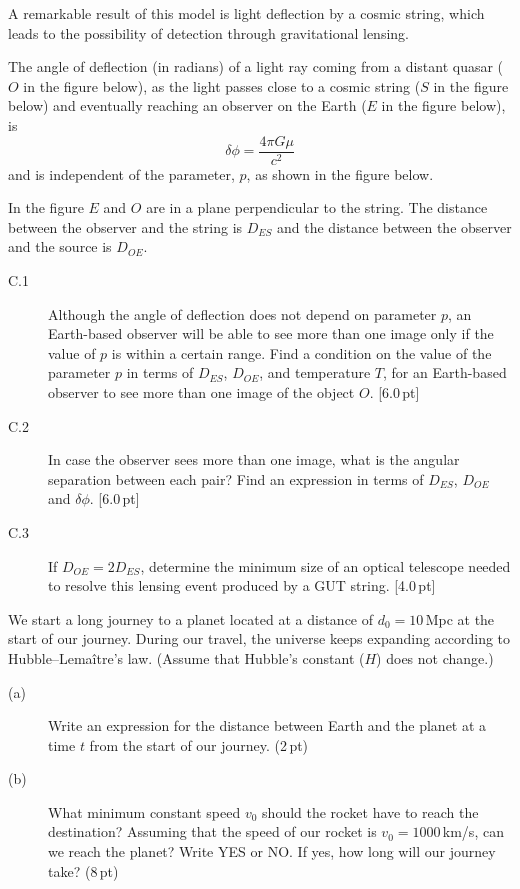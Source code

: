 A remarkable result of this model is light deflection by a cosmic string,
which leads to the possibility of detection through gravitational lensing.

The angle of deflection (in radians) of a light ray coming from a distant
quasar ($O$ in the figure below), as the light passes close to a cosmic string
($S$ in the figure below) and eventually reaching an observer on the Earth
($E$ in the figure below), is
\[ \delta\phi = \frac{4\pi G\mu}{c^2} \]
and is independent of the parameter, $p$, as shown in the figure below.

In the figure $E$ and $O$ are in a plane perpendicular to the string. The
distance between the observer and the string is $D_{ES}$ and the distance
between the observer and the source is $D_{OE}$.


\begin{description}
\item[C.1] Although the angle of deflection does not depend on parameter $p$,
  an Earth-based observer will be able to see more than one image only if the
  value of $p$ is within a certain range. Find a condition on the value of the
  parameter $p$ in terms of $D_{ES}$, $D_{OE}$, and temperature $T$, for an
  Earth-based observer to see more than one image of the object $O$.
  \hfill[6.0\,pt]
\item[C.2] In case the observer sees more than one image, what is the angular
  separation between each pair? Find an expression in terms of $D_{ES}$,
  $D_{OE}$ and $\delta\phi$. \hfill[6.0\,pt]
\item[C.3] If $D_{OE} = 2D_{ES}$, determine the minimum size of an optical
  telescope needed to resolve this lensing event produced by a GUT string.
  \hfill[4.0\,pt]
\end{description}

We start a long journey to a planet located at a distance of
$d_0 = 10$\,Mpc at the start of our journey. During our travel, the universe
keeps expanding according to Hubble--Lema\^itre's law. (Assume that Hubble's
constant ($H$) does not change.)

\begin{description}
\item[(a)] Write an expression for the distance between Earth and the planet
  at a time $t$ from the start of our journey. \hfill(2\,pt)
\item[(b)] What minimum constant speed $v_0$ should the rocket have to reach
  the destination? Assuming that the speed of our rocket is
  $v_0 = 1000$\,km/s, can we reach the planet? Write YES or NO. If yes, how
  long will our journey take? \hfill(8\,pt)
\end{description}

